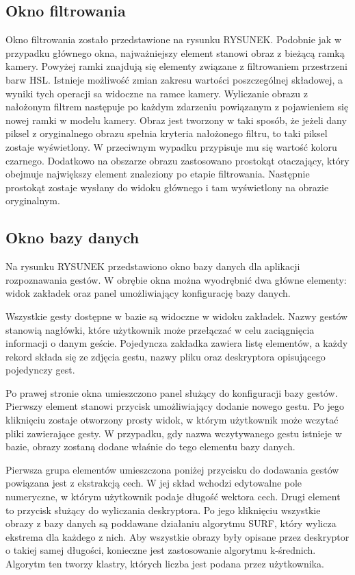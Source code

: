 \subsection{Okno filtrowania}
\label{subsec: HslFIlter}
Okno filtrowania zostało przedstawione na rysunku RYSUNEK. Podobnie jak w  przypadku głównego okna, najważniejszy element stanowi obraz z bieżącą ramką kamery. Powyżej ramki znajdują się elementy związane z filtrowaniem przestrzeni barw HSL. Istnieje możliwość zmian zakresu wartości poszczególnej składowej, a wyniki tych operacji sa widoczne na ramce kamery. Wyliczanie obrazu z nałożonym filtrem następuje po każdym zdarzeniu powiązanym z pojawieniem się nowej ramki w modelu kamery.
Obraz jest tworzony w taki sposób, że jeżeli dany piksel z oryginalnego obrazu spełnia kryteria nałożonego filtru, to taki piksel zostaje wyświetlony. W przeciwnym wypadku przypisuje mu się wartość koloru czarnego. Dodatkowo na obszarze obrazu zastosowano prostokąt otaczający, który obejmuje największy element znaleziony po etapie filtrowania. Następnie prostokąt zostaje wysłany do widoku głównego i tam wyświetlony na obrazie oryginalnym. 
\subsection{Okno bazy danych}
\label{subsec: Database}
Na rysunku RYSUNEK przedstawiono okno bazy danych dla aplikacji rozpoznawania gestów. W obrębie okna można wyodrębnić dwa główne elementy: widok zakładek oraz panel umożliwiający konfigurację bazy danych. 

Wszystkie gesty dostępne w bazie są widoczne w widoku zakładek. Nazwy gestów stanowią nagłówki, które użytkownik może przełączać w celu zaciągnięcia informacji o danym geście. Pojedyncza zakładka zawiera listę elementów, a każdy rekord składa się ze zdjęcia gestu, nazwy pliku oraz deskryptora opisującego pojedynczy gest.

Po prawej stronie okna umieszczono panel służący do konfiguracji bazy gestów. Pierwszy element stanowi przycisk umożliwiający dodanie nowego gestu. Po jego kliknięciu zostaje otworzony prosty widok, w którym użytkownik może wczytać pliki zawierające gesty. W przypadku, gdy nazwa wczytywanego gestu istnieje w bazie, obrazy zostaną dodane właśnie do tego elementu bazy danych. 

Pierwsza grupa elementów umieszczona poniżej przycisku do dodawania gestów powiązana jest z ekstrakcją cech. W jej skład wchodzi edytowalne pole numeryczne, w którym użytkownik podaje długość wektora cech. Drugi element to przycisk służący do wyliczania deskryptora. Po jego kliknięciu wszystkie obrazy z bazy danych są poddawane działaniu algorytmu SURF, który wylicza ekstrema dla każdego z nich. Aby wszystkie obrazy były opisane przez deskryptor o takiej samej długości, konieczne jest zastosowanie algorytmu k-średnich. Algorytm ten tworzy klastry, których liczba jest podana przez użytkownika.

